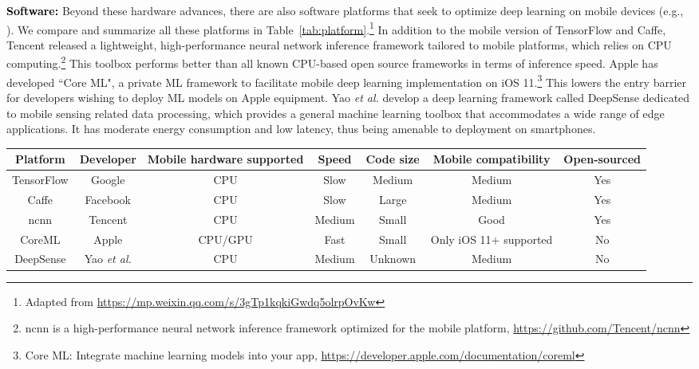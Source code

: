 \documentclass[journal,comsoc,letter]{IEEEtran}
\newcommand{\edit}[1]{\textcolor{black}{#1}}
\begin{document}
\edit{\textbf{Software:}} Beyond these hardware advances, there are also software platforms that seek to optimize deep learning on mobile devices (e.g., \cite{latifi2016cnndroid}). We compare and summarize all these platforms in Table~\ref{tab:platform}.\footnote{Adapted from \url{https://mp.weixin.qq.com/s/3gTp1kqkiGwdq5olrpOvKw}} In addition to the mobile version of TensorFlow and Caffe, Tencent released a lightweight, high-performance neural network inference framework tailored to mobile platforms, which relies on CPU computing.\footnote{ncnn is a high-performance neural network inference framework optimized for the mobile platform, \url{https://github.com/Tencent/ncnn}} This toolbox performs better than all known CPU-based open source frameworks in terms of inference speed. Apple has developed ``Core ML", a private ML framework to facilitate mobile deep learning implementation on iOS 11.\footnote{Core ML: Integrate machine learning models into your app, \url{https://developer.apple.com/documentation/coreml}} This lowers the entry barrier for developers wishing to deploy ML models on Apple equipment. Yao \emph{et al.} develop a deep learning framework called DeepSense dedicated to mobile sensing related data processing, which provides a general machine learning toolbox that accommodates a wide range of edge applications. It has moderate energy consumption and low latency, thus being amenable to deployment on smartphones.

\begin{table*}[htb]
\centering
\caption{Comparison of mobile deep learning platform.}
\label{tab:platform}
\begin{tabular}{|c|c|c|c|c|c|c|}
\hline
\textbf{Platform}   & \textbf{Developer} & \textbf{Mobile hardware supported} & \textbf{Speed}  & \textbf{Code size} & \textbf{Mobile compatibility} & \textbf{Open-sourced} \\ \hline
TensorFlow & Google    & CPU                       & Slow   & Medium    & Medium               & Yes        \\ \hline
Caffe      & Facebook  & CPU                       & Slow   & Large     & Medium               & Yes        \\ \hline
ncnn       & Tencent   & CPU                       & Medium & Small     & Good                 & Yes        \\ \hline
CoreML     & Apple     & CPU/GPU                   & Fast   & Small     & Only iOS 11+ supported  & No  \\ \hline
DeepSense     & Yao \emph{et al.}     & CPU                   & Medium   & Unknown     & Medium  & No  \\ \hline
\end{tabular}
\end{table*}
\end{document}
